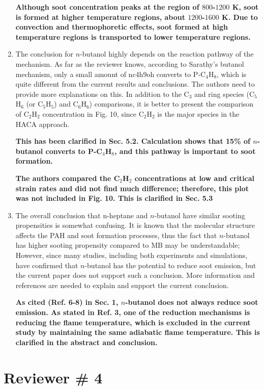 \documentclass[10pt,letterpaper]{article}
\begin{document}
\begin{enumerate}
\textbf{Although soot concentration peaks at the region of $800$-$1200$ K, soot is formed at higher temperature regions, about $1200$-$1600$ K.  Due to convection and thermophoretic effects, soot formed at high temperature regions is transported to lower temperature regions.}

\item The conclusion for $n$-butanol highly depends on the reaction pathway of the mechanism. As far as the reviewer knows, according to Sarathy's butanol mechanism, only a small amount of nc4h9oh converts to P-C$_4$H$_8$, which is quite different from the current results and conclusions. The authors need to provide more explanations on this. In addition to the C$_3$ and ring species (C$_5$H$_6$ (or C$_5$H$_5$) and C$_6$H$_6$) comparisons, it is better to present the comparison of C$_2$H$_2$ concentration in Fig. 10, since C$_2$H$_2$ is the major species in the HACA approach.

\textbf{This has been clarified in Sec. 5.2.  Calculation shows that 15\% of $n$-butanol converts to P-C$_4$H$_8$, and this pathway is important to soot formation.}

\textbf{The authors compared the C$_2$H$_2$ concentrations at low and critical strain rates and did not find much difference; therefore, this plot was not included in Fig. 10.  This is clarified in Sec. 5.3}

\item The overall conclusion that n-heptane and $n$-butanol have similar sooting propensities is somewhat confusing. It is known that the molecular structure affects the PAH and soot formation processes, thus the fact that $n$-butanol has higher sooting propensity compared to MB may be understandable; However, since many studies, including both experiments and simulations, have confirmed that $n$-butanol has the potential to reduce soot emission, but the current paper does not support such a conclusion. More information and references are needed to explain and support the current conclusion.

\textbf{As cited (Ref. 6-8) in Sec. 1, $n$-butanol does not always reduce soot emission.  As stated in Ref. 3, one of the reduction mechanisms is reducing the flame temperature, which is excluded in the current study by maintaining the same adiabatic flame temperature.  This is clarified in the abstract and conclusion.}

\end{enumerate}

\newpage
\section{Reviewer \# 4}
\end{document}
